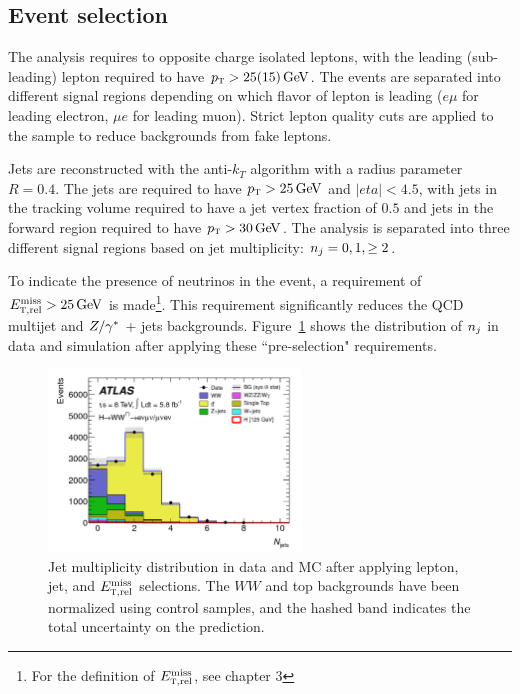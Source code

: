 \subsection{Event selection}

The analysis requires to opposite charge isolated leptons, with the leading (sub-leading) lepton required to have $\pT > 25 (15) \GeV$. The events are separated into different signal regions depending on which flavor of lepton is leading ($e\mu$ for leading electron, $\mu e$ for leading muon). Strict lepton quality cuts are applied to the sample to reduce backgrounds from fake leptons.

Jets are reconstructed with the anti-$k_{T}$ algorithm with a radius parameter $R = 0.4$. The jets are required to have $\pT > 25 \GeV$ and $|eta| < 4.5$, with jets in the tracking volume required to have a jet vertex fraction of $0.5$ and jets in the forward region required to have $\pT > 30 \GeV$. The analysis is separated into three different signal regions based on jet multiplicity: $n_j = 0, 1, \geq 2$. 

To indicate the presence of neutrinos in the event, a requirement of $\METrel > 25 \GeV$ is made\footnote{For the definition of $E_{{\textrm{\footnotesize\sc t}},{\rm rel}}^{\rm miss}$, see chapter 3}. This requirement significantly reduces the QCD multijet and $Z/\gamma^{\ast}$ + jets backgrounds. Figure~\ref{fig:disc_njet} shows the distribution of $n_j$ in data and simulation after applying these ``pre-selection" requirements. 


\begin{figure}[h!]
  \centering
  \captionsetup{justification=centering}
  \includegraphics[width=0.6\textwidth]{figures/disc_njet}
  \caption{Jet multiplicity distribution in data and MC after applying lepton, jet, and $E_{{\textrm{\footnotesize\sc t}},{\rm rel}}^{\rm miss}$ selections. The $WW$ and top backgrounds have been normalized using control samples, and the hashed band indicates the total uncertainty on the prediction.~\cite{Discovery} }
  \label{fig:disc_njet}
\end{figure}

